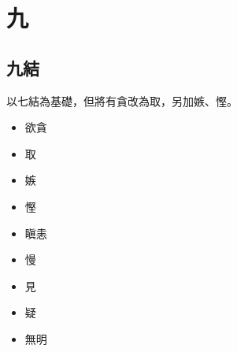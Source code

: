 \section{九}

\subsection{九結}
以七結為基礎，但將有貪改為取，另加嫉、慳。
\begin{itemize}
  \item 欲貪
  \item 取
  \item 嫉
  \item 慳
  \item 瞋恚
  \item 慢
  \item 見
  \item 疑
  \item 無明
\end{itemize}
